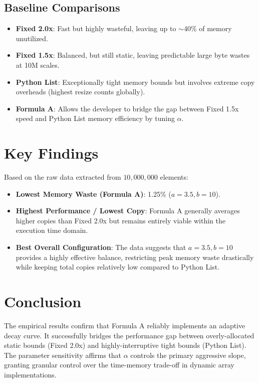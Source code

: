 \documentclass[11pt, a4paper]{article}
\begin{document}
\subsection{Baseline Comparisons}
\begin{itemize}
    \item \textbf{Fixed 2.0x}: Fast but highly wasteful, leaving up to $\sim$40\% of memory unutilized.
    \item \textbf{Fixed 1.5x}: Balanced, but still static, leaving predictable large byte wastes at 10M scales.
    \item \textbf{Python List}: Exceptionally tight memory bounds but involves extreme copy overheads (highest resize counts globally).
    \item \textbf{Formula A}: Allows the developer to bridge the gap between Fixed 1.5x speed and Python List memory efficiency by tuning $\alpha$.
\end{itemize}

\section{Key Findings}
Based on the raw data extracted from $10,000,000$ elements:
\begin{itemize}
    \item \textbf{Lowest Memory Waste (Formula A)}: 1.25\% ($a=3.5, b=10$).
    \item \textbf{Highest Performance / Lowest Copy}: Formula A generally averages higher copies than Fixed 2.0x but remains entirely viable within the execution time domain.
    \item \textbf{Best Overall Configuration}: The data suggests that $a=3.5, b=10$ provides a highly effective balance, restricting peak memory waste drastically while keeping total copies relatively low compared to Python List.
\end{itemize}

\section{Conclusion}
The empirical results confirm that Formula A reliably implements an adaptive decay curve. It successfully bridges the performance gap between overly-allocated static bounds (Fixed 2.0x) and highly-interruptive tight bounds (Python List). The parameter sensitivity affirms that $\alpha$ controls the primary aggressive slope, granting granular control over the time-memory trade-off in dynamic array implementations.
\end{document}
